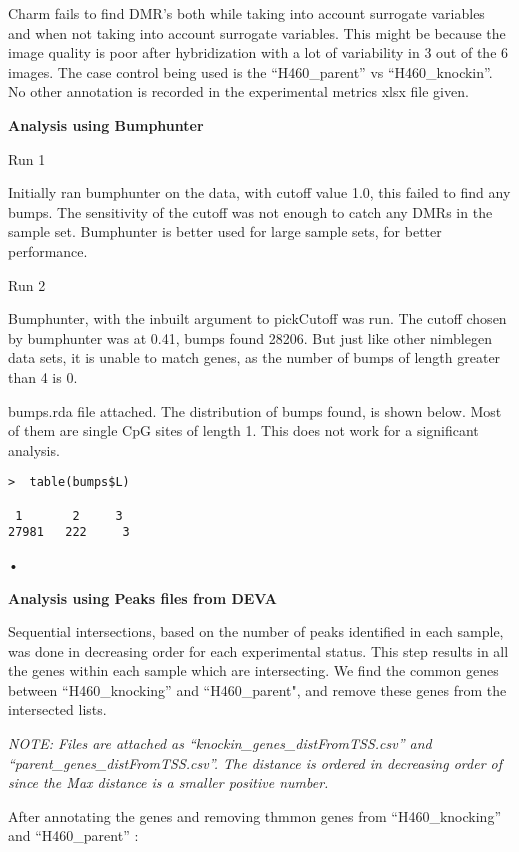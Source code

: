 \documentclass[11pt]{article}
\begin{document}
Charm fails to find DMR’s both while taking into account surrogate variables and when not taking into account surrogate variables. This might be because the image quality is poor after hybridization with a lot of variability in 3 out of the 6 images. The case control being used is the “H460\_parent” vs “H460\_knockin”. No other annotation is recorded in the experimental metrics xlsx file given.



{\bf Analysis using Bumphunter}

Run  1

Initially ran bumphunter on the data, with cutoff value 1.0, this failed to find any bumps. The sensitivity of the cutoff was not enough to catch any DMRs in the sample set. Bumphunter is better used for large sample sets, for better performance. 


Run  2

Bumphunter, with the inbuilt argument to pickCutoff was run. The cutoff chosen by bumphunter was at 0.41, bumps found 28206. But just like other nimblegen data sets, it is unable to match genes, as the number of bumps of length greater than 4 is 0.

bumps.rda file attached. The distribution of bumps found, is shown below. Most of them are single CpG sites of length 1. This does not work for a significant analysis.

\begin{verbatim}
>  table(bumps$L)

 1       2     3 
27981   222     3 

\end{verbatim}•



{\bf Analysis using Peaks files from DEVA}

Sequential intersections, based on the number of peaks identified in each sample, was done in decreasing order for each experimental status. This step results in all the genes within each sample which are intersecting.
We find the common genes between “H460\_knocking” and “H460\_parent", and remove these genes from the intersected lists.

{\it NOTE:  Files are attached as “knockin\_genes\_distFromTSS.csv” and “parent\_genes\_distFromTSS.csv”. The distance is ordered in decreasing order of since the Max distance is a smaller positive number.}

After annotating the genes and removing thmmon genes from “H460\_knocking” and “H460\_parent” : 
\end{document}
